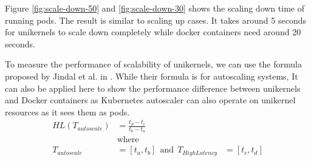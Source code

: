 Figure \ref{fig:scale-down-50} and \ref{fig:scale-down-30} shows the scaling down time of running pods. The result is similar to scaling up cases. It takes around 5 seconds for unikernels to scale down completely while docker containers need around 20 seconds. 

To measure the performance of scalability of unikernels, we can use the formula proposed by Jindal et al. in \cite{multilayered}. While their formula is for autoscaling systems, It can also be applied here to show the performance difference between unikernels and Docker containers as Kubernetes autoscaler can also operate on unikernel resources as it sees them as pods.
\begin{equation*}
  \begin{aligned}
  HL(T_{autoscale})&=\frac{t_d-t_c}{t_b-t_a} \\
  &\textrm{where} \\ 
  T_{autoscale}&=[t_a,t_b] \ \ \textrm{and} \ \ T_{HighLatency}&=[t_c,t_d]
  \end{aligned}
\end{equation*}

